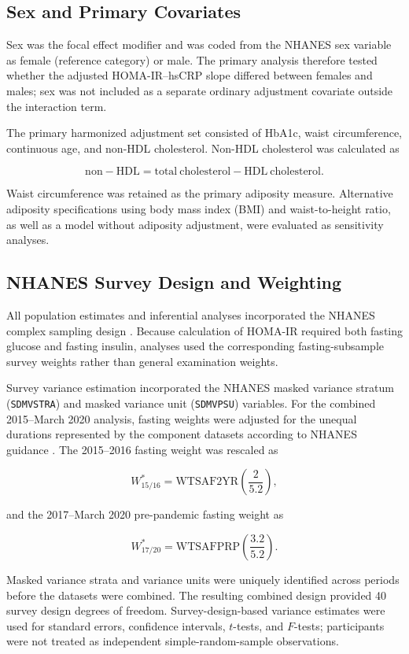 \documentclass[11pt]{article}
\begin{document}
\subsection{Sex and Primary Covariates}

Sex was the focal effect modifier and was coded from the NHANES sex variable
as female (reference category) or male. The primary analysis therefore tested
whether the adjusted HOMA-IR--hsCRP slope differed between females and males;
sex was not included as a separate ordinary adjustment covariate outside the
interaction term.

The primary harmonized adjustment set consisted of HbA1c, waist circumference,
continuous age, and non-HDL cholesterol. Non-HDL cholesterol was calculated as

\[
\mathrm{non\!-\!HDL}
=
\mathrm{total\ cholesterol}
-
\mathrm{HDL\ cholesterol}.
\]

Waist circumference was retained as the primary adiposity measure. Alternative
adiposity specifications using body mass index (BMI) and waist-to-height ratio,
as well as a model without adiposity adjustment, were evaluated as sensitivity
analyses.

\subsection{NHANES Survey Design and Weighting}

All population estimates and inferential analyses incorporated the NHANES
complex sampling design \citep{NHANES2017_2020Guidelines}. Because calculation
of HOMA-IR required both fasting glucose and fasting insulin, analyses used the
corresponding fasting-subsample survey weights rather than general examination
weights.

Survey variance estimation incorporated the NHANES masked variance stratum
(\texttt{SDMVSTRA}) and masked variance unit (\texttt{SDMVPSU}) variables.
For the combined 2015--March 2020 analysis, fasting weights were adjusted for
the unequal durations represented by the component datasets according to
NHANES guidance \citep{NHANES2017_2020Guidelines}. The 2015--2016 fasting
weight was rescaled as

\[
W_{15/16}^{*}
=
\mathrm{WTSAF2YR}
\left(\frac{2}{5.2}\right),
\]

and the 2017--March 2020 pre-pandemic fasting weight as

\[
W_{17/20}^{*}
=
\mathrm{WTSAFPRP}
\left(\frac{3.2}{5.2}\right).
\]

Masked variance strata and variance units were uniquely identified across
periods before the datasets were combined. The resulting combined design
provided 40 survey design degrees of freedom. Survey-design-based variance
estimates were used for standard errors, confidence intervals, $t$-tests,
and $F$-tests; participants were not treated as independent
simple-random-sample observations.
\end{document}
